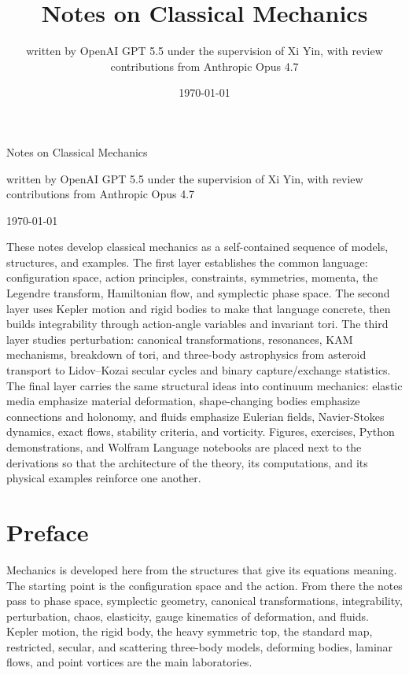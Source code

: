 \documentclass[11pt]{book}
\title{Notes on Classical Mechanics}
\author{written by OpenAI GPT 5.5 under the supervision of Xi Yin, with review contributions from Anthropic Opus 4.7}
\date{\today}
\begin{document}
\frontmatter
\begin{titlepage}
\thispagestyle{empty}
\centering
\vspace*{0.16\textheight}
{\huge Notes on Classical Mechanics\par}
\vspace{1.25cm}
{\large
\begin{minipage}{0.82\textwidth}
\centering
written by OpenAI GPT 5.5 under the supervision of Xi Yin, with review
contributions from Anthropic Opus 4.7
\end{minipage}\par}
\vspace{0.6cm}
{\large \today\par}
\vfill
\begin{minipage}{0.88\textwidth}
\small
\setlength{\parindent}{0pt}
These notes develop classical mechanics as a self-contained sequence of models,
structures, and examples.  The first layer establishes the common language:
configuration space, action principles, constraints, symmetries, momenta, the
Legendre transform, Hamiltonian flow, and symplectic phase space.  The second
layer uses Kepler motion and rigid bodies to make that language concrete, then
builds integrability through action-angle variables and invariant tori.  The
third layer studies perturbation: canonical transformations, resonances, KAM
mechanisms, breakdown of tori, and three-body astrophysics from asteroid
transport to Lidov--Kozai secular cycles and binary capture/exchange
statistics.  The final
layer carries the same structural ideas into continuum mechanics: elastic
media emphasize material deformation, shape-changing bodies emphasize
connections and holonomy, and fluids emphasize Eulerian fields, Navier-Stokes
dynamics, exact flows, stability criteria, and vorticity.  Figures, exercises,
Python demonstrations, and Wolfram Language notebooks are placed next to the
derivations so that the architecture of the theory, its computations, and its
physical examples reinforce one another.
\end{minipage}
\vspace*{0.10\textheight}
\end{titlepage}

\tableofcontents

\chapter*{Preface}

Mechanics is developed here from the structures that give its equations
meaning. The starting point is the configuration space and the action. From
there the notes pass to phase space, symplectic geometry, canonical
transformations, integrability, perturbation, chaos, elasticity, gauge
kinematics of deformation, and fluids. Kepler motion, the rigid body, the
heavy symmetric top, the standard map, restricted, secular, and scattering
three-body models, deforming bodies, laminar flows, and point vortices are the
main laboratories.
\end{document}

